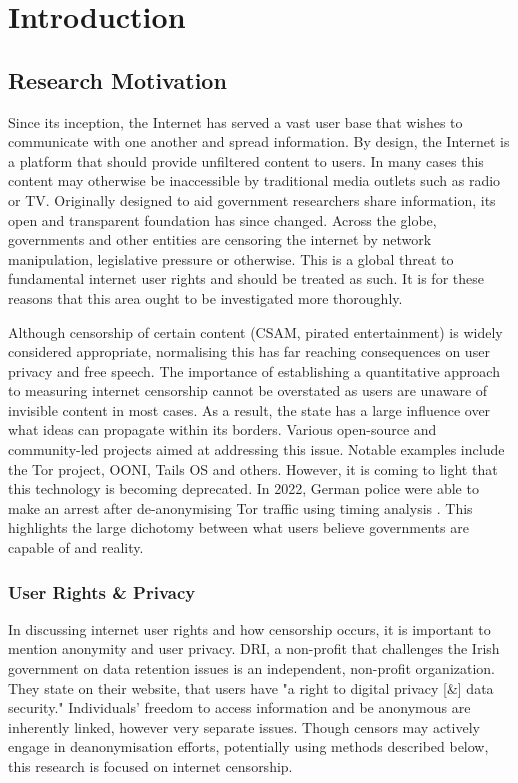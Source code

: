 \chapter{Introduction}

\section{Research Motivation}

Since its inception, the Internet has served a vast user base that wishes to communicate with one another and spread information. By design, the Internet is a platform that should provide unfiltered content to users. In many cases this content may otherwise be inaccessible by traditional media outlets such as radio or TV. Originally designed to aid government researchers share information, its open and transparent foundation has since changed. Across the globe, governments and other entities are censoring the internet by network manipulation, legislative pressure or otherwise. This is a global threat to fundamental internet user rights and should be treated as such. It is for these reasons that this area ought to be investigated more thoroughly.

Although censorship of certain content (CSAM, pirated entertainment) is widely considered appropriate, normalising this has far reaching consequences on user privacy and free speech. The importance of establishing a quantitative approach to measuring internet censorship cannot be overstated as users are unaware of invisible content in most cases. As a result, the state has a large influence over what ideas can propagate within its borders. Various open-source and community-led projects aimed at addressing this issue. Notable examples include the Tor project, OONI, Tails OS and others. However, it is coming to light that this technology is becoming deprecated. In 2022, German police were able to make an arrest after de-anonymising Tor traffic using timing analysis \cite{TorDeanonymization}. This highlights the large dichotomy between what users believe governments are capable of and reality. 

\subsection{User Rights \& Privacy}
In discussing internet user rights and how censorship occurs, it is important to mention anonymity and user privacy. DRI, a non-profit that challenges the Irish government on data retention issues is an independent, non-profit organization. They state on their website, that users have "a right to digital privacy [\&] data security." \cite{digital_rights_ireland} Individuals' freedom to access information and be anonymous are inherently linked, however very separate issues. Though censors may actively engage in deanonymisation efforts, potentially using methods described below, this research is focused on internet censorship.


